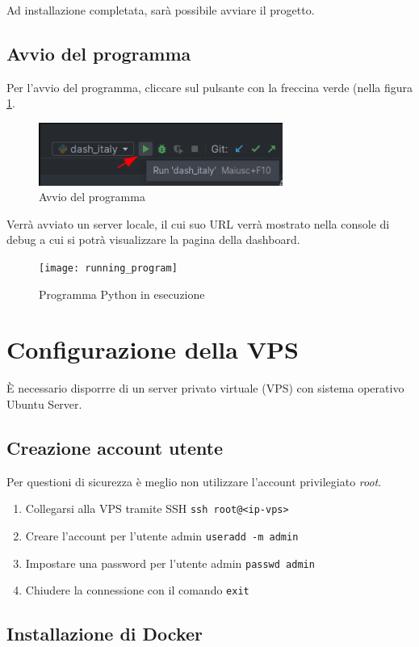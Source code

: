 Ad installazione completata, sarà possibile avviare il progetto.

\subsection{Avvio del programma}
Per l'avvio del programma, cliccare sul pulsante con la freccina verde (nella figura \ref{fig:run_dash}.
\begin{figure}[htp]
    \centering
    \includegraphics[width=8cm]{img/run_dash.png}
    \caption{Avvio del programma}
    \label{fig:run_dash}
\end{figure}
Verrà avviato un server locale, il cui suo URL verrà mostrato nella console di debug a cui si potrà visualizzare la pagina della dashboard.

 \begin{figure}[htp]
    \centering
    \texttt{[image: running\_program]}
    \caption{Programma Python in esecuzione}
    \label{fig:running_program}
\end{figure}

\section{Configurazione della VPS}
È necessario disporrre di un server privato virtuale (VPS) con sistema operativo Ubuntu Server.

\subsection{Creazione account utente}
Per questioni di sicurezza è meglio non utilizzare l'account privilegiato \emph{root}.
\begin{enumerate}
\item Collegarsi alla VPS tramite SSH \texttt{ssh root@<ip-vps>}
\item Creare l'account per l'utente admin \texttt{useradd -m admin}
\item Impostare una password per l'utente admin \texttt{passwd admin}
\item Chiudere la connessione con il comando \texttt{exit}
\end{enumerate}

\subsection{Installazione di Docker}

